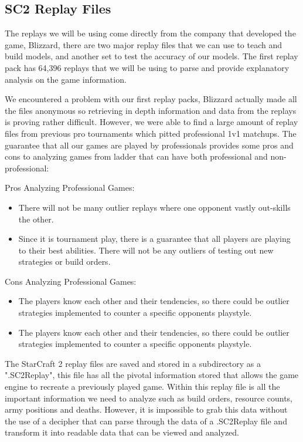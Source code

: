 \documentclass[a4paper,12pt]{report}
\begin{document}
\subsection{SC2 Replay Files}
The replays we will be using come directly from the company that developed the game, Blizzard, there are two major replay files that we can use to teach and build models, and another set to test the accuracy of our models. The first replay pack has 64,396 replays that we will be using to parse and provide explanatory analysis on the game information.

We encountered a problem with our first replay packs, Blizzard actually made all the files anonymous so retrieving in depth information and data from the replays is proving rather difficult. However, we were able to find a large amount of replay files from previous pro tournaments which pitted professional 1v1 matchups. The guarantee that all our games are played by professionals provides some pros and cons to analyzing games from ladder that can have both professional and non-professional:

Pros Analyzing Professional Games:
\vspace*{-.8cm}
\begin{itemize}[,]
    \setlength\itemsep{-.1cm}
    \item There will not be many outlier replays where one opponent vastly out-skills the other.
    \item Since it is tournament play, there is a guarantee that all players are playing to their best abilities. There will not be any outliers of testing out new strategies or build orders.
\end{itemize}

Cons Analyzing Professional Games:
\vspace*{-.775cm}
\begin{itemize}[,]
    \setlength\itemsep{-.1cm}
    \item The players know each other and their tendencies, so there could be outlier strategies implemented to counter a specific opponents playstyle.
    \item The players know each other and their tendencies, so there could be outlier strategies implemented to counter a specific opponents playstyle.
\end{itemize}

The StarCraft 2 replay files are saved and stored in a subdirectory as a ".SC2Replay", this file has all the pivotal information stored that allows the game engine to recreate a previously played game. Within this replay file is all the important information we need to analyze such as build orders, resource counts, army positions and deaths. However, it is impossible to grab this data without the use of a decipher that can parse through the data of a .SC2Replay file and transform it into readable data that can be viewed and analyzed.
\end{document}
